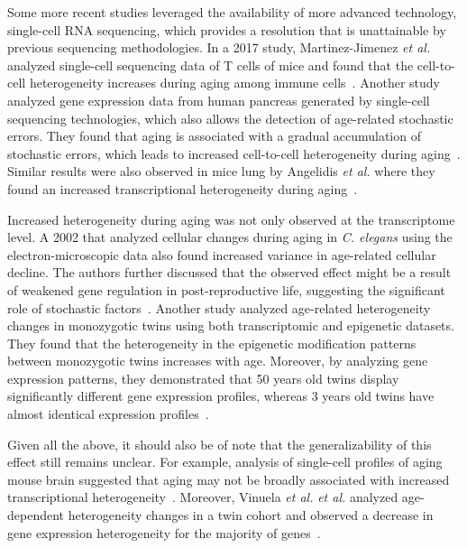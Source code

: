 Some more recent studies leveraged the availability of more advanced technology, single-cell RNA sequencing,
which provides a resolution that is unattainable by previous sequencing methodologies.
In a 2017 study, Martinez-Jimenez \textit{et al.} analyzed single-cell sequencing data of T cells of mice
and found that the cell-to-cell heterogeneity increases during aging among immune cells~\autocite{Martinez2017}.
Another study analyzed gene expression data from human pancreas generated by single-cell sequencing technologies,
which also allows the detection of age-related stochastic errors.
They found that aging is associated with a gradual accumulation of stochastic errors,
which leads to increased cell-to-cell heterogeneity during aging~\autocite{Enge2017}.
Similar results were also observed in mice lung by Angelidis \textit{et al.} 
where they found an increased transcriptional heterogeneity during aging~\autocite{Angelidis2019}.

Increased heterogeneity during aging was not only observed at the transcriptome level.
A 2002 that analyzed cellular changes during aging in \textit{C. elegans} using the electron-microscopic data also found increased variance in age-related cellular decline.
The authors further discussed that the observed effect might be a result of weakened gene regulation in post-reproductive life, 
suggesting the significant role of stochastic factors~\autocite{Herndon2002}.
Another study analyzed age-related heterogeneity changes in monozygotic twins using both transcriptomic and epigenetic datasets.
They found that the heterogeneity in the epigenetic modification patterns between monozygotic twins increases with age.
Moreover, by analyzing gene expression patterns, they demonstrated that 50 years old twins display significantly different gene expression profiles,
whereas 3 years old twins have almost identical expression profiles~\autocite{Fraga2005}.

Given all the above, it should also be of note that the generalizability of this effect still remains unclear.
For example, analysis of single-cell profiles of aging mouse brain suggested that 
aging may not be broadly associated with increased transcriptional heterogeneity~\autocite{Ximerakis2019}.
Moreover, Vinuela \textit{et al.} \textit{et al.} analyzed age-dependent heterogeneity changes in a twin cohort
and observed a decrease in gene expression heterogeneity for the majority of genes~\autocite{Vinuela2018}.

